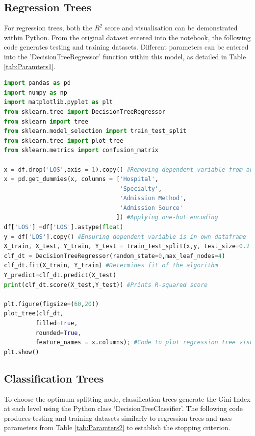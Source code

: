 \documentclass[../thesis.tex]{subfiles}
\begin{document}
\subsection{Regression Trees}\label{sec:pythonreg}
For regression trees, both the $R^{2}$ score and visualisation can be demonstrated within Python. From the original dataset entered into the notebook, the following code generates testing and training datasets. Different parameters can be entered into the 'DecisionTreeRegressor' function within this model, as detailed in Table \ref{tab:Paramters1}.
\begin{lstlisting}[language = python]
import pandas as pd
import numpy as np
import matplotlib.pyplot as plt
from sklearn.tree import DecisionTreeRegressor
from sklearn import tree
from sklearn.model_selection import train_test_split
from sklearn.tree import plot_tree
from sklearn.metrics import confusion_matrix

x = df.drop('LOS',axis = 1).copy() #Removing dependent variable from analysis
x = pd.get_dummies(x, columns = ['Hospital',
                                 'Specialty',
                                 'Admission Method',
                                 'Admission Source'
                                ]) #Applying one-hot encoding
df['LOS'] =df['LOS'].astype(float)
y = df['LOS'].copy() #Ensuring dependent variable is in own dataframe
X_train, X_test, Y_train, Y_test = train_test_split(x,y, test_size=0.2, random_state=0) #Creating training and testing data
clf_dt = DecisionTreeRegressor(random_state=0,max_leaf_nodes=4)
clf_dt.fit(X_train, Y_train) #Determines fit of the algorithm
Y_predict=clf_dt.predict(X_test)
print(clf_dt.score(X_test,Y_test)) #Prints R-squared score

plt.figure(figsize=(60,20))
plot_tree(clf_dt,
         filled=True,
         rounded=True,
         feature_names = x.columns); #Code to plot regression tree visual
plt.show()
\end{lstlisting}


\subsection{Classification Trees}\label{sec:pythonclass}
To choose the optimum splitting node, classification trees generate the Gini Index at each level using the Python class `DecisionTreeClassifier'. The following code produces testing and training datasets similarly to regression trees and uses parameters from Table \ref{tab:Paramters2} to establish the stopping criterion.
\end{document}
